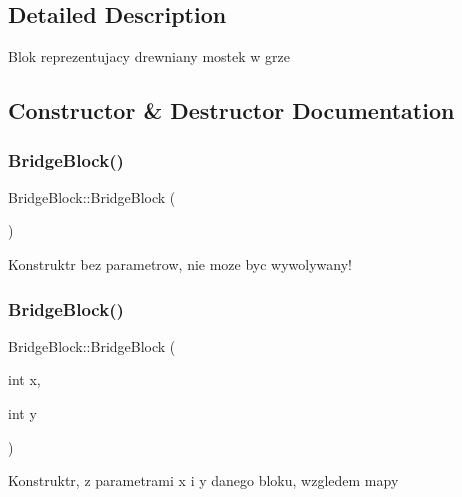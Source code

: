 \subsection{Detailed Description}
Blok reprezentujacy drewniany mostek w grze 

\subsection{Constructor \& Destructor Documentation}
\mbox{\label{class_bridge_block_a3a383311a5e2472e435c1633eeccab3d}} 
\subsubsection{\texorpdfstring{Bridge\+Block()}{BridgeBlock()}\hspace{0.1cm}{\footnotesize\ttfamily [1/2]}}
{\footnotesize\ttfamily Bridge\+Block\+::\+Bridge\+Block (\begin{DoxyParamCaption}{ }\end{DoxyParamCaption})}

Konstruktr bez parametrow, nie moze byc wywolywany! \mbox{\label{class_bridge_block_a17bb807971dbc0b222a27e6bd18a9085}} 
\subsubsection{\texorpdfstring{Bridge\+Block()}{BridgeBlock()}\hspace{0.1cm}{\footnotesize\ttfamily [2/2]}}
{\footnotesize\ttfamily Bridge\+Block\+::\+Bridge\+Block (\begin{DoxyParamCaption}\item[{int}]{x,  }\item[{int}]{y }\end{DoxyParamCaption})}

Konstruktr, z parametrami x i y danego bloku, wzgledem mapy \mbox{\label{class_bridge_block_a56ad5e506bc091b779289a053bf45393}} 
